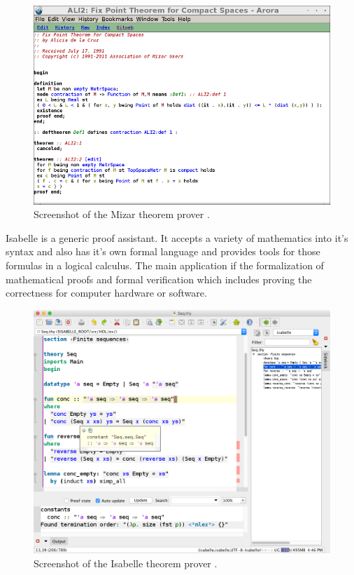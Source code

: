 \begin{figure}[H]
\begin{center}
\includegraphics[scale=0.5]{Figures/Background/mizar.png}
\end{center}
\caption{Screenshot of the Mizar theorem prover \cite{mizar}. \label{fig:mizar}}
\end{figure}

Isabelle \cite{isabelle} is a generic proof assistant. It accepts a variety of
mathematics into it's syntax and also has it's own formal language and provides
tools for those formulas in a logical calculus. The main application if the
formalization of mathematical proofs and formal verification which includes
proving the correctness for computer hardware or software.

\begin{figure}[H]
\begin{center}
\includegraphics[scale=0.4]{Figures/Background/isabelle.png}
\end{center}
\caption{Screenshot of the Isabelle theorem prover \cite{isabelle}. \label{fig:isabelle}}
\end{figure}

